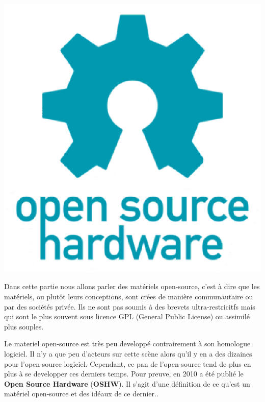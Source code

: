 \vspace{15px}
\begin{minipage}{0.40\linewidth}
\includegraphics[scale=0.3]{oshw-logo.eps}
\end{minipage}\hfill
\begin{minipage}{0.55\linewidth}
Dans cette partie nous allons parler des matériels open-source, c'est à dire que les matériels, ou plutôt leurs conceptions, sont crées de manière communautaire ou par des sociétés privée. Ils ne sont pas soumis à des brevets ultra-restricitfs mais qui sont le plus souvent sous licence GPL (General Public License) ou assimilé plus souples. 
\end{minipage}
\medskip
Le materiel open-source est très peu developpé contrairement à son homologue logiciel. Il n'y a que peu d'acteurs sur cette scène alors qu'il y en a des dizaines pour l'open-source logiciel. Cependant, ce pan de l'open-source tend de plus en plus à se developper ces derniers temps. Pour preuve, en 2010 a été publié le \textbf{Open Source Hardware} (\textbf{OSHW}). Il s'agit d'une définition de ce qu'est un matériel open-source et des idéaux de ce dernier..
\medskip
